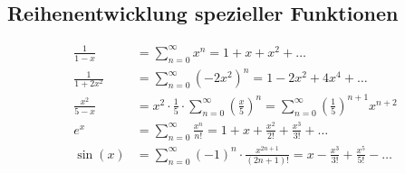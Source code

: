 \subsection{Reihenentwicklung spezieller Funktionen}
    \vspace*{-1.7em}
    \begin{align*}
        \frac{1}{1-x} &= \sum_{n=0}^\infty x^n = 1 + x + x^2 + \dots\\
        \frac{1}{1+2x^2} &= \sum_{n=0}^\infty (-2x^2)^n = 1 - 2x^2 + 4x^4 + \dots\\
        \frac{x^2}{5-x} &= x^2 \cdot \frac{1}{5} \cdot \sum_{n=0}^\infty \left( \frac{x}{5} \right)^n = \sum_{n=0}^\infty \left( \frac{1}{5} \right)^{n+1} x^{n+2}\\
        e^x &= \sum_{n=0}^\infty \frac{x^n}{n!} = 1 + x + \frac{x^2}{2!} + \frac{x^3}{3!} + \dots\\
        \sin(x) &= \sum_{n=0}^\infty (-1)^n \cdot \frac{x^{2n+1}}{(2n+1)!} = x - \frac{x^3}{3!} + \frac{x^5}{5!} - \dots
    \end{align*}